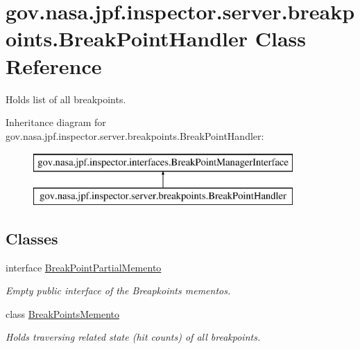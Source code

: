 \hypertarget{classgov_1_1nasa_1_1jpf_1_1inspector_1_1server_1_1breakpoints_1_1_break_point_handler}{}\section{gov.\+nasa.\+jpf.\+inspector.\+server.\+breakpoints.\+Break\+Point\+Handler Class Reference}
\label{classgov_1_1nasa_1_1jpf_1_1inspector_1_1server_1_1breakpoints_1_1_break_point_handler}


Holds list of all breakpoints.  


Inheritance diagram for gov.\+nasa.\+jpf.\+inspector.\+server.\+breakpoints.\+Break\+Point\+Handler\+:\begin{figure}[H]
\begin{center}
\leavevmode
\includegraphics[height=2.000000cm]{classgov_1_1nasa_1_1jpf_1_1inspector_1_1server_1_1breakpoints_1_1_break_point_handler}
\end{center}
\end{figure}
\subsection*{Classes}
\begin{DoxyCompactItemize}
\item 
interface \hyperlink{interfacegov_1_1nasa_1_1jpf_1_1inspector_1_1server_1_1breakpoints_1_1_break_point_handler_1_1_break_point_partial_memento}{Break\+Point\+Partial\+Memento}
\begin{DoxyCompactList}\small\item\em Empty public interface of the Breapkoints mementos. \end{DoxyCompactList}\item 
class \hyperlink{classgov_1_1nasa_1_1jpf_1_1inspector_1_1server_1_1breakpoints_1_1_break_point_handler_1_1_break_points_memento}{Break\+Points\+Memento}
\begin{DoxyCompactList}\small\item\em Holds traversing related state (hit counts) of all breakpoints. \end{DoxyCompactList}\end{DoxyCompactItemize}
